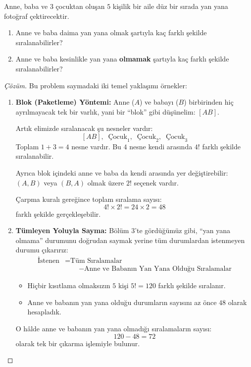 \begin{example}
Anne, baba ve $3$ çocuktan oluşan $5$ kişilik bir aile düz bir sırada yan yana fotoğraf çektirecektir.
\begin{enumerate}
  \item Anne ve baba daima yan yana olmak şartıyla kaç farklı şekilde sıralanabilirler?
  \item Anne ve baba kesinlikle yan yana \textbf{olmamak} şartıyla kaç farklı şekilde sıralanabilirler?
\end{enumerate}
\end{example}
\begin{proof}[Çözüm]
Bu problem saymadaki iki temel yaklaşımı örnekler:
\begin{enumerate}
  \item \textbf{Blok (Paketleme) Yöntemi:} Anne ($A$) ve babayı ($B$) birbirinden hiç ayrılmayacak tek bir varlık, yani bir ``blok'' gibi düşünelim: $[AB]$.
  
  Artık elimizde sıralanacak şu nesneler vardır:
  \[ [AB], \;\; \text{Çocuk}_1, \;\; \text{Çocuk}_2, \;\; \text{Çocuk}_3 \]
  Toplam $1 + 3 = 4$ nesne vardır. Bu $4$ nesne kendi arasında $4!$ farklı şekilde sıralanabilir.
  
  Ayrıca blok içindeki anne ve baba da kendi arasında yer değiştirebilir: $(A, B)$ veya $(B, A)$ olmak üzere $2!$ seçenek vardır.
  
  Çarpma kuralı gereğince toplam sıralama sayısı:
  \[ 4! \times 2! = 24 \times 2 = 48 \]
  farklı şekilde gerçekleşebilir.

  \item \textbf{Tümleyen Yoluyla Sayma:} Bölüm 3'te gördüğümüz gibi, ``yan yana olmama'' durumunu doğrudan saymak yerine tüm durumlardan istenmeyen durumu çıkarırız:
  \begin{align*}
  \text{İstenen} &= \text{Tüm Sıralamalar}\\
  &\qquad - \text{Anne ve Babanın Yan Yana Olduğu Sıralamalar}
  \end{align*}
  \begin{itemize}
    \item Hiçbir kısıtlama olmaksızın $5$ kişi $5! = 120$ farklı şekilde sıralanır.
    \item Anne ve babanın yan yana olduğu durumların sayısını az önce $48$ olarak hesapladık.
  \end{itemize}
  O hâlde anne ve babanın yan yana olmadığı sıralamaların sayısı:
  \[ 120 - 48 = 72 \]
  olarak tek bir çıkarma işlemiyle bulunur.
\end{enumerate}
\end{proof}

